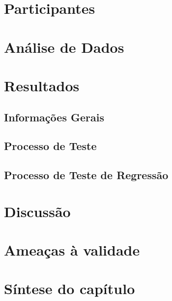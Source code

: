 \section{Participantes}

\section{Análise de Dados}


\section{Resultados}

\subsection{Informações Gerais}

\subsection{Processo de Teste}

\subsection{Processo de Teste de Regressão}

\section{Discussão}

\section{Ameaças à validade}

\section{Síntese do capítulo}





